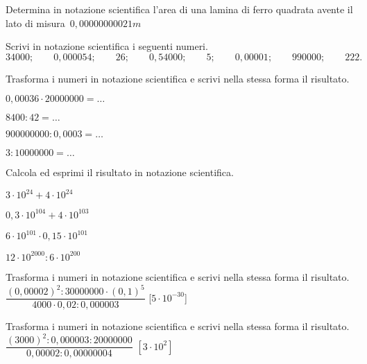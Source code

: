 \begin{esercizio}
 \label{ese:3.63}
Determina in notazione scientifica l'area di una lamina di ferro quadrata
avente il lato di misura~\(0,00000000021\unit{m}\)
\end{esercizio}

\begin{esercizio}
 \label{ese:3.64}
Scrivi in notazione scientifica i seguenti numeri.
\[34000;\qquad0,000054;\qquad26;\qquad0,54000;\qquad5;\qquad0,00001;
\qquad990000;\qquad222.\]
\end{esercizio}

\begin{esercizio}
 \label{ese:3.65}
Trasforma i numeri in notazione scientifica e scrivi nella stessa forma il 
risultato.
\begin{multicols}{2}
\begin{enumeratea}
\item \(0,00036\cdot20000000=\ldots\)
\item \(8400:42=\ldots\)
\item \(900000000:0,0003=\ldots\)
\item \(3:10000000=\ldots\)
\end{enumeratea}
\end{multicols}
\end{esercizio}
\clearpage
\begin{esercizio}
 \label{ese:3.66}
Calcola ed esprimi il risultato in notazione scientifica.
\begin{multicols}{2}
\begin{enumeratea}
\item \(3\cdot10^{24} +4\cdot10^{24}\)
\item \(0,3\cdot10^{104} +4\cdot10^{103}\)
\item \(6\cdot10^{101}\cdot0,15\cdot10^{101}\)
\item \(12\cdot10^{2000}:6\cdot10^{200}\)
\end{enumeratea}
\end{multicols}
\end{esercizio}

\begin{esercizio}[\Ast]
 \label{ese:3.67}
Trasforma i numeri in notazione scientifica e scrivi nella stessa forma il 
risultato.
\(\dfrac{(0,00002)^2:30000000\cdot(0,1)^5}{4000 \cdot0,02:0,000003}\)
\hfill [\(5\cdot10^{-30}\)]
\end{esercizio}

\begin{esercizio}[\Ast]
 \label{ese:3.68}
Trasforma i numeri in notazione scientifica e scrivi nella stessa forma il 
risultato.
\(\dfrac{(3000)^2:0,000003:20000000}{0,00002:0,00000004}\)
\hfill \(\left[3\cdot10^2 \right]\)
\end{esercizio}

